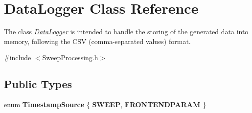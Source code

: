 \hypertarget{classDataLogger}{}\section{Data\+Logger Class Reference}
\label{classDataLogger}


The class {\itshape \hyperlink{classDataLogger}{Data\+Logger}} is intended to handle the storing of the generated data into memory, following the C\+SV (comma-\/separated values) format.  




{\ttfamily \#include $<$Sweep\+Processing.\+h$>$}

\subsection*{Public Types}
\begin{DoxyCompactItemize}
\item 
\mbox{\label{classDataLogger_ae3b42b5c9f4066ffc85d01ad588310aa}} 
enum {\bfseries Timestamp\+Source} \{ {\bfseries S\+W\+E\+EP}, 
{\bfseries F\+R\+O\+N\+T\+E\+N\+D\+P\+A\+R\+AM}
 \}
\end{DoxyCompactItemize}
